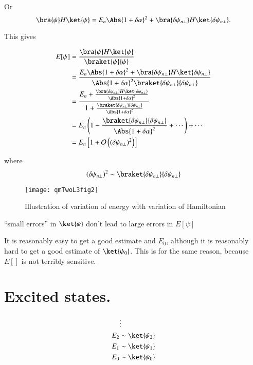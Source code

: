 Or
\begin{equation}\label{eqn:qmTwoL3:130}
\bra{\psi} H \ket{\psi}
= 
E_n \Abs{1 + \delta \alpha }^2
+
\bra{\delta \psi_{n \perp}} H \ket{\delta \psi_{n \perp}}.
\end{equation}

This gives

\begin{align*}
E[\psi] 
&= 
\frac{
\bra{\psi} H \ket{\psi}
}
{
\braket{\psi}{\psi}
} \\
&=
\frac{
E_n \Abs{1 + \delta \alpha }^2 + 
\bra{\delta \psi_{n \perp}} H \ket{\delta \psi_{n \perp}}
}
{
\Abs{1 + \delta \alpha }^2
\braket{\delta \psi_{n \perp}}{\delta \psi_{n \perp}} 
} \\
&=
\frac{
E_n 
+ 
\frac{\bra{\delta \psi_{n \perp}} H \ket{\delta \psi_{n \perp}} }
{\Abs{1 + \delta \alpha }^2}
}
{
1
+\frac{\braket{\delta \psi_{n \perp}}{\delta \psi_{n \perp}} }
{\Abs{1 + \delta \alpha }^2}
} \\
&=
E_n \left( 1 - 
\frac{\braket{\delta \psi_{n \perp}}{\delta \psi_{n \perp}} }
{\Abs{1 + \delta \alpha }^2}
+ \cdots \right) + \cdots \\
&=
E_n\left[1 + \mathcal{O}\left((\delta \psi_{n \perp})^2\right)\right]
\end{align*}

where
\begin{equation}\label{eqn:qmTwoL3:150}
(\delta \psi_{n \perp})^2
\sim
\braket{\delta \psi_{n \perp}}{\delta \psi_{n \perp}}
\end{equation}

\begin{figure}[htp]
\centering
\texttt{[image: qmTwoL3fig2]}
\caption{Illustration of variation of energy with variation of Hamiltonian}\label{fig:qmTwoL3fig2}
\end{figure}

``small errors'' in $\ket{\psi}$ don't lead to large errors in $E[\psi]$

It is reasonably easy to get a good estimate and $E_0$, although it is reasonably hard to get a good estimate of $\ket{\psi_0}$.  This is for the same reason, because $E[]$ is not terribly sensitive.

\section{Excited states.}

\begin{align*}
&\vdots \\
E_2 &\sim \ket{\psi_2} \\
E_1 &\sim \ket{\psi_1} \\
E_0 &\sim \ket{\psi_0}
\end{align*}

